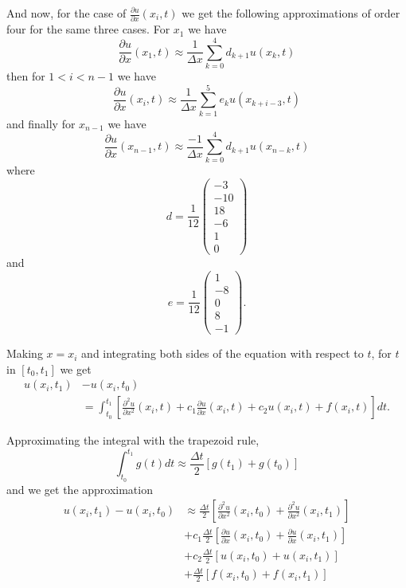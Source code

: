 \documentclass[00main.tex]{subfiles}
\begin{document}
And now, for the case of $\frac{\partial u}{\partial x} (x_i,t)$ we get the following approximations of order four for the same three cases. %
For $x_1$ we have \[ \frac{\partial u}{\partial x} (x_1,t) \approx \frac{1}{\Delta x} \sum_{k=0}^4 d_{k+1} u(x_k,t)\] %
then for $1 < i < n-1$ we have \[ \frac{\partial u}{\partial x} (x_i,t) \approx \frac{1}{\Delta x} \sum_{k=1}^5 e_k u(x_{k+i-3},t)\] %
and finally for $x_{n-1}$ we have \[ \frac{\partial u}{\partial x} (x_{n-1},t) \approx \frac{-1}{\Delta x} \sum_{k=0}^4 d_{k+1} u(x_{n-k},t) \] where \[ d = \frac{1}{12} \left( \begin{array}{c}
-3\\ -10\\ 18\\ -6\\ 1\\ 0
\end{array} \right) \] and \[ e = \frac{1}{12} \left( \begin{array}{c}
1\\ -8\\ 0\\ 8\\ -1
\end{array} \right) . \]

Making $x = x_i$ and integrating both sides of the equation with respect to $t$, for $t$ in $[t_0, t_1]$ we get \begin{align*}
u(x_i,t_1) &- u(x_i,t_0)\\ & =  \int_{t_0}^{t_1} \left[ \frac{\partial^2 u}{\partial x^2} (x_i,t) + c_1 \frac{\partial u}{\partial x} (x_i,t) + c_2 u(x_i,t) + f(x_i,t) \right] dt .
\end{align*}

Approximating the integral with the trapezoid rule, \[ \int_{t_0}^{t_1} g(t) dt \approx \frac{\Delta t}{2} \left[ g(t_1) + g(t_0)\right] \] and we get the approximation \begin{align*}
u(x_i, t_1) - u(x_i, t_0) & \approx \frac{\Delta t}{2} \left[ \frac{\partial^2u}{\partial x^2} (x_i,t_0) + \frac{\partial^2u}{\partial x^2} (x_i,t_1) \right] \\ & +c_1 \frac{\Delta t}{2} \left[ \frac{\partial u}{\partial x} (x_i,t_0) + \frac{\partial u}{\partial x} (x_i,t_1) \right] \\
 & + c_2 \frac{\Delta t}{2} \left[ u(x_i,t_0) + u(x_i, t_1) \right]\\ & + \frac{\Delta t}{2} \left[ f(x_i,t_0) + f(x_i,t_1) \right]
\end{align*}
\end{document}
